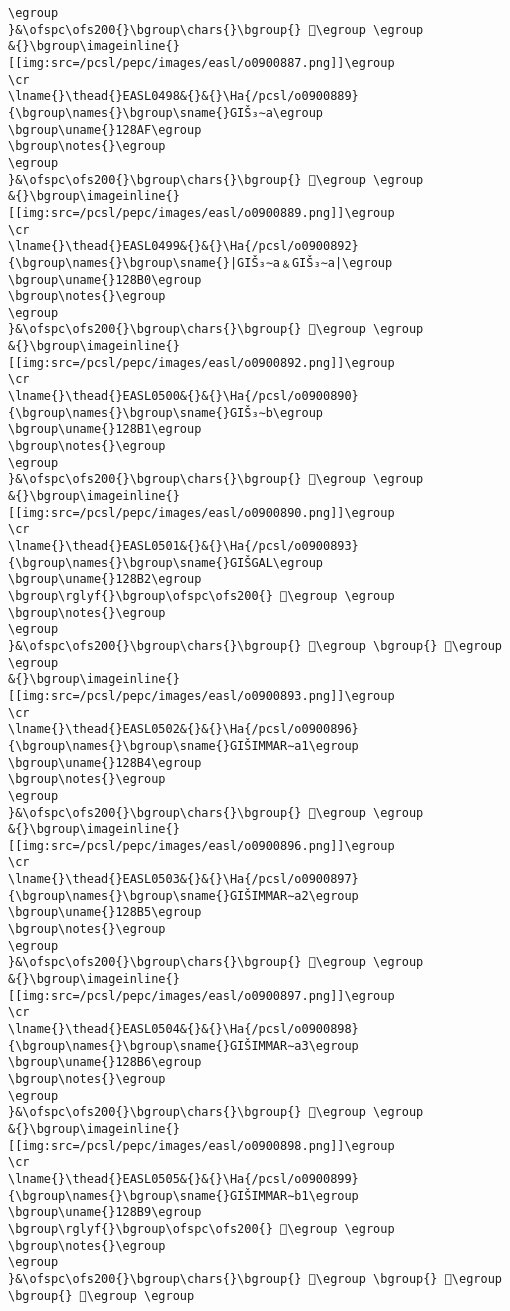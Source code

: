 \begin{verbatim}
\egroup
}&\ofspc\ofs200{}\bgroup\chars{}\bgroup{} 󲵀\egroup \egroup
&{}\bgroup\imageinline{}[[img:src=/pcsl/pepc/images/easl/o0900887.png]]\egroup
\cr
\lname{}\thead{}EASL0498&{}&{}\Ha{/pcsl/o0900889}{\bgroup\names{}\bgroup\sname{}GIŠ₃∼a\egroup
\bgroup\uname{}128AF\egroup
\bgroup\notes{}\egroup
\egroup
}&\ofspc\ofs200{}\bgroup\chars{}\bgroup{} 𒢯\egroup \egroup
&{}\bgroup\imageinline{}[[img:src=/pcsl/pepc/images/easl/o0900889.png]]\egroup
\cr
\lname{}\thead{}EASL0499&{}&{}\Ha{/pcsl/o0900892}{\bgroup\names{}\bgroup\sname{}|GIŠ₃∼a﹠GIŠ₃∼a|\egroup
\bgroup\uname{}128B0\egroup
\bgroup\notes{}\egroup
\egroup
}&\ofspc\ofs200{}\bgroup\chars{}\bgroup{} 𒢰\egroup \egroup
&{}\bgroup\imageinline{}[[img:src=/pcsl/pepc/images/easl/o0900892.png]]\egroup
\cr
\lname{}\thead{}EASL0500&{}&{}\Ha{/pcsl/o0900890}{\bgroup\names{}\bgroup\sname{}GIŠ₃∼b\egroup
\bgroup\uname{}128B1\egroup
\bgroup\notes{}\egroup
\egroup
}&\ofspc\ofs200{}\bgroup\chars{}\bgroup{} 𒢱\egroup \egroup
&{}\bgroup\imageinline{}[[img:src=/pcsl/pepc/images/easl/o0900890.png]]\egroup
\cr
\lname{}\thead{}EASL0501&{}&{}\Ha{/pcsl/o0900893}{\bgroup\names{}\bgroup\sname{}GIŠGAL\egroup
\bgroup\uname{}128B2\egroup
\bgroup\rglyf{}\bgroup\ofspc\ofs200{} 𒢲\egroup \egroup
\bgroup\notes{}\egroup
\egroup
}&\ofspc\ofs200{}\bgroup\chars{}\bgroup{} 𒢳\egroup \bgroup{} 𒢲\egroup \egroup
&{}\bgroup\imageinline{}[[img:src=/pcsl/pepc/images/easl/o0900893.png]]\egroup
\cr
\lname{}\thead{}EASL0502&{}&{}\Ha{/pcsl/o0900896}{\bgroup\names{}\bgroup\sname{}GIŠIMMAR∼a1\egroup
\bgroup\uname{}128B4\egroup
\bgroup\notes{}\egroup
\egroup
}&\ofspc\ofs200{}\bgroup\chars{}\bgroup{} 𒢴\egroup \egroup
&{}\bgroup\imageinline{}[[img:src=/pcsl/pepc/images/easl/o0900896.png]]\egroup
\cr
\lname{}\thead{}EASL0503&{}&{}\Ha{/pcsl/o0900897}{\bgroup\names{}\bgroup\sname{}GIŠIMMAR∼a2\egroup
\bgroup\uname{}128B5\egroup
\bgroup\notes{}\egroup
\egroup
}&\ofspc\ofs200{}\bgroup\chars{}\bgroup{} 𒢵\egroup \egroup
&{}\bgroup\imageinline{}[[img:src=/pcsl/pepc/images/easl/o0900897.png]]\egroup
\cr
\lname{}\thead{}EASL0504&{}&{}\Ha{/pcsl/o0900898}{\bgroup\names{}\bgroup\sname{}GIŠIMMAR∼a3\egroup
\bgroup\uname{}128B6\egroup
\bgroup\notes{}\egroup
\egroup
}&\ofspc\ofs200{}\bgroup\chars{}\bgroup{} 𒢶\egroup \egroup
&{}\bgroup\imageinline{}[[img:src=/pcsl/pepc/images/easl/o0900898.png]]\egroup
\cr
\lname{}\thead{}EASL0505&{}&{}\Ha{/pcsl/o0900899}{\bgroup\names{}\bgroup\sname{}GIŠIMMAR∼b1\egroup
\bgroup\uname{}128B9\egroup
\bgroup\rglyf{}\bgroup\ofspc\ofs200{} 𒢹\egroup \egroup
\bgroup\notes{}\egroup
\egroup
}&\ofspc\ofs200{}\bgroup\chars{}\bgroup{} 𒢷\egroup \bgroup{} 𒢸\egroup \bgroup{} 𒢹\egroup \egroup

\end{verbatim}
